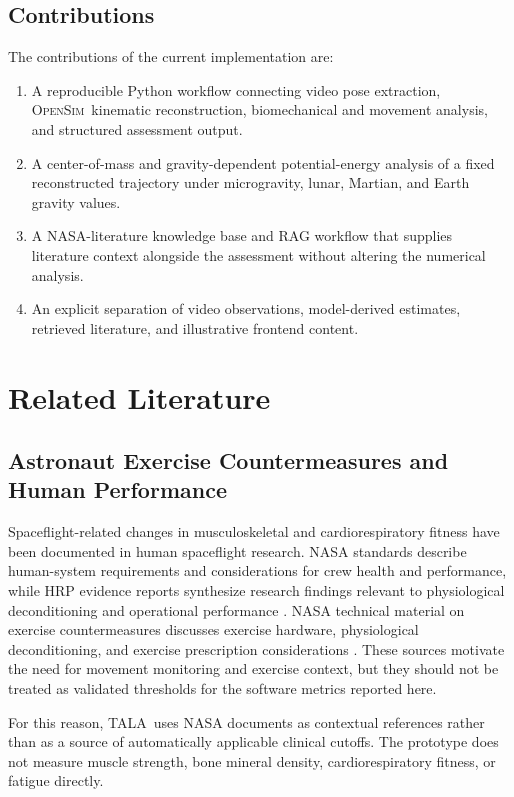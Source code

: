 \documentclass[11pt,a4paper]{article}
\newcommand{\TALA}{\textsc{TALA}}
\newcommand{\OpenSim}{\textsc{OpenSim}}
\begin{document}
\subsection{Contributions}

The contributions of the current implementation are:
\begin{enumerate}[label=C\arabic*.]
  \item A reproducible Python workflow connecting video pose extraction, \OpenSim\ kinematic reconstruction, biomechanical and movement analysis, and structured assessment output.
  \item A center-of-mass and gravity-dependent potential-energy analysis of a fixed reconstructed trajectory under microgravity, lunar, Martian, and Earth gravity values.
  \item A NASA-literature knowledge base and RAG workflow that supplies literature context alongside the assessment without altering the numerical analysis.
  \item An explicit separation of video observations, model-derived estimates, retrieved literature, and illustrative frontend content.
\end{enumerate}

\section{Related Literature}

\subsection{Astronaut Exercise Countermeasures and Human Performance}

Spaceflight-related changes in musculoskeletal and cardiorespiratory fitness have been documented in human spaceflight research. NASA standards describe human-system requirements and considerations for crew health and performance, while HRP evidence reports synthesize research findings relevant to physiological deconditioning and operational performance \cite{nasa_std1,nasa_std2,hrp_fitness}. NASA technical material on exercise countermeasures discusses exercise hardware, physiological deconditioning, and exercise prescription considerations \cite{ochmo_exercise}. These sources motivate the need for movement monitoring and exercise context, but they should not be treated as validated thresholds for the software metrics reported here.

For this reason, \TALA\ uses NASA documents as contextual references rather than as a source of automatically applicable clinical cutoffs. The prototype does not measure muscle strength, bone mineral density, cardiorespiratory fitness, or fatigue directly.
\end{document}
